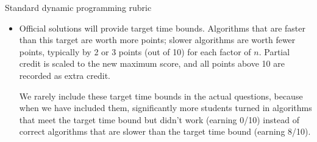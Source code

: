 \documentclass[11pt]{article}
\begin{document}
\begin{rubric}{Standard dynamic programming rubric}
\begin{itemize}
\item
Official solutions will provide target time bounds.  Algorithms that are faster than this target are worth more points; slower algorithms are worth fewer points, typically by 2 or 3 points (out of 10) for each factor of $n$.  Partial credit is scaled to the new maximum score, and all points above 10 are recorded as extra credit.

\qquad We rarely include these target time bounds in the actual questions, because when we have included them, significantly more students turned in algorithms that meet the target time bound but didn’t work (earning 0/10) instead of correct algorithms that are slower than the target time bound (earning 8/10).
\end{itemize}

\end{rubric}
\end{document}
